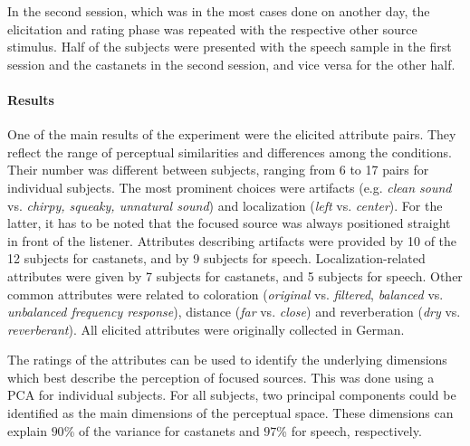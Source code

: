 In the second session, which was in the most cases done on another day, the
elicitation and rating phase was repeated with the respective other source
stimulus. Half of the subjects were presented with the speech sample in the
first session and the castanets in the second session, and vice versa for the
other half.


\paragraph{Results}
%
One of the main results of the experiment were the elicited attribute pairs. They
reflect the range of perceptual similarities and differences among the
conditions. Their number was different between subjects, ranging from 6 to
17 pairs for individual subjects.
The most prominent choices were artifacts (e.g. \emph{clean sound} vs.
\emph{chirpy, squeaky, unnatural sound}) and localization (\emph{left} vs.
\emph{center}). For the latter, it has to be noted that the focused source was
always positioned straight in front of
the listener. Attributes describing artifacts were provided by 10 of the 12
subjects for castanets, and by 9 subjects for speech. Localization-related
attributes were given by 7 subjects for castanets, and 5 subjects for speech.
Other common attributes were related to coloration (\emph{original} vs.
\emph{filtered}, \emph{balanced} vs. \emph{unbalanced frequency response}),
distance (\emph{far} vs. \emph{close}) and reverberation (\emph{dry} vs.
\emph{reverberant}).
All elicited attributes were originally collected in German.

The ratings of the attributes can be used to identify the underlying dimensions
which best
describe the perception of focused sources. This was done using
a \ac{PCA} for individual subjects.
For all subjects, two principal components could be identified as the main
dimensions of the perceptual space. These dimensions can explain
$90$\% of the variance for castanets and $97$\% for
speech, respectively.

